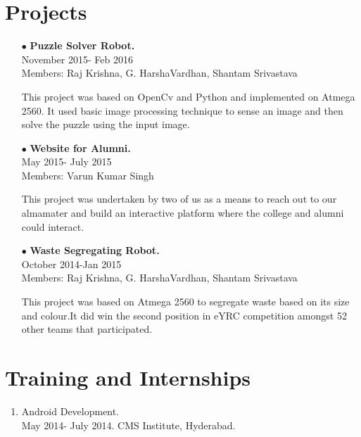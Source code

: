 \documentclass[12pt]{article}
\begin{document}
\section*{Projects}
\begin{itemize}
\item[$\bullet$]\textbf{Puzzle Solver Robot.}\\November 2015- Feb 2016\\Members: Raj Krishna, G. HarshaVardhan, Shantam Srivastava

This project was based on OpenCv and Python and implemented on Atmega 2560. It used basic image processing technique to sense an image and then solve the puzzle using the input image.
\item[$\bullet$]\textbf{Website for Alumni.}\\May 2015- July 2015\\Members: Varun Kumar Singh

This project was undertaken by two of us as a means to reach out to our almamater and build an interactive platform where the college and alumni could interact.
\item[$\bullet$]\textbf{Waste Segregating Robot.}\\October 2014-Jan 2015 \\Members: Raj Krishna, G. HarshaVardhan, Shantam Srivastava

This project was based on Atmega 2560 to segregate waste based on its size and colour.It did win the second position in eYRC competition amongst 52 other teams that participated.
\end{itemize}
\section*{Training and Internships}
\begin{enumerate}
\item Android Development.\\May 2014- July 2014. CMS Institute, Hyderabad.
\end{enumerate}
\end{document}
